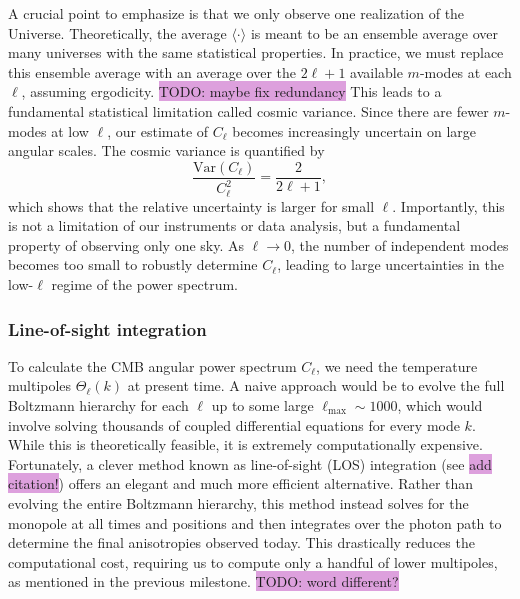 \documentclass{aa}
\numberwithin{equation}{section}
\numberwithin{table}{section}
\numberwithin{figure}{section}
\begin{document}
A crucial point to emphasize is that we only observe one realization of the Universe. Theoretically, the average $\langle \cdot \rangle$ is meant to be an ensemble average over many universes with the same statistical properties. In practice, we must replace this ensemble average with an average over the $2\ell + 1$ available $m$-modes at each $\ell$, assuming ergodicity. \colorbox{Plum}{TODO: maybe fix redundancy} This leads to a fundamental statistical limitation called cosmic variance. Since there are fewer $m$-modes at low $\ell$, our estimate of $C_\ell$ becomes increasingly uncertain on large angular scales. The cosmic variance is quantified by  
\begin{equation}
\frac{\mathrm{Var}(C_\ell)}{C_\ell^2} = \frac{2}{2\ell + 1},
\end{equation}
which shows that the relative uncertainty is larger for small $\ell$. Importantly, this is not a limitation of our instruments or data analysis, but a fundamental property of observing only one sky. As $\ell \to 0$, the number of independent modes becomes too small to robustly determine $C_\ell$, leading to large uncertainties in the low-$\ell$ regime of the power spectrum.








\subsubsection{Line-of-sight integration}\label{subsubsec: IV theory LOS}
To calculate the CMB angular power spectrum $C_\ell$, we need the temperature multipoles $\Theta_\ell(k)$ at present time. A naive approach would be to evolve the full Boltzmann hierarchy for each $\ell$ up to some large $\ell_{\text{max}} \sim 1000$, which would involve solving thousands of coupled differential equations for every mode $k$. While this is theoretically feasible, it is extremely computationally expensive. Fortunately, a clever method known as line-of-sight (LOS) integration (see \colorbox{Plum}{add citation!}) offers an elegant and much more efficient alternative.
Rather than evolving the entire Boltzmann hierarchy, this method instead solves for the monopole at all times and positions and then integrates over the photon path to determine the final anisotropies observed today. This drastically reduces the computational cost, requiring us to compute only a handful of lower multipoles, as mentioned in the previous milestone. \colorbox{Plum}{TODO: word different?}
\end{document}
